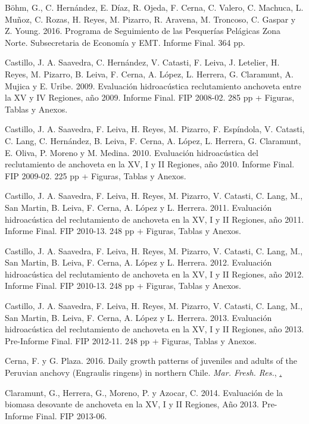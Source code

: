 \documentclass[letter,11pt]{article}
\begin{document}
B\"ohm, G., C. Hern\'andez, E. D\'iaz, R. Ojeda, F. Cerna, C. Valero, C.
Machuca, L. Mu\~{n}oz, C. Rozas, H. Reyes, M. Pizarro, R. Aravena, M.
Troncoso, C. Gaspar y Z. Young. 2016. Programa de Seguimiento de las
Pesquer\'ias Pel\'agicas Zona Norte. Subsecretaria de Econom\'ia y EMT.
Informe Final. 364 pp.


Castillo, J. A. Saavedra, C. Hern\'andez, V. Catasti, F. Leiva, J.
Letelier, H. Reyes, M. Pizarro, B. Leiva, F. Cerna, A. L\'opez, L.
Herrera, G. Claramunt, A. Mujica y E. Uribe. 2009. Evaluaci\'on
hidroac\'ustica reclutamiento anchoveta entre la XV y IV Regiones, a\~{n}o
2009. Informe Final. FIP 2008-02. 285 pp + Figuras, Tablas y Anexos.

Castillo, J. A. Saavedra, F. Leiva, H. Reyes, M. Pizarro, F. Esp\'indola,
V. Catasti, C. Lang, C. Hern\'andez, B. Leiva, F. Cerna, A. L\'opez, L.
Herrera, G. Claramunt, E. Oliva, P. Moreno y M. Medina. 2010. Evaluaci\'on
hidroac\'ustica del reclutamiento de anchoveta en la XV, I y II Regiones,
a\~{n}o 2010. Informe Final. FIP 2009-02. 225 pp + Figuras, Tablas y Anexos.

Castillo, J. A. Saavedra, F. Leiva, H. Reyes, M. Pizarro, V. Catasti, C.
Lang, M., San Martin, B. Leiva, F. Cerna, A. L\'opez y L. Herrera. 2011.
Evaluaci\'on hidroac\'ustica del reclutamiento de anchoveta en la XV, I y II
Regiones, a\~{n}o 2011. Informe Final. FIP 2010-13. 248 pp + Figuras, Tablas
y Anexos.

Castillo, J. A. Saavedra, F. Leiva, H. Reyes, M. Pizarro, V. Catasti, C.
Lang, M., San Martin, B. Leiva, F. Cerna, A. L\'opez y L. Herrera. 2012.
Evaluaci\'on hidroac\'ustica del reclutamiento de anchoveta en la XV, I y II
Regiones, a\~{n}o 2012. Informe Final. FIP 2010-13. 248 pp + Figuras, Tablas
y Anexos.

Castillo, J. A. Saavedra, F. Leiva, H. Reyes, M. Pizarro, V. Catasti, C.
Lang, M., San Martin, B. Leiva, F. Cerna, A. L\'opez y L. Herrera. 2013.
Evaluaci\'on hidroac\'ustica del reclutamiento de anchoveta en la XV, I y II
Regiones, a\~{n}o 2013. Pre-Informe Final. FIP 2012-11. 248 pp + Figuras,
Tablas y Anexos.

Cerna, F. y G. Plaza. 2016. Daily growth patterns of juveniles and
adults of the Peruvian anchovy (Engraulis ringens) in northern Chile.
\textit{Mar. Fresh. Res.}, \href{http://dx.doi.org/10.1071/MF15032}.


Claramunt, G., Herrera, G., Moreno, P. y Azocar, C. 2014. Evaluaci\'on de
la biomasa desovante de anchoveta en la XV, I y II Regiones, A\~{n}o 2013.
Pre-Informe Final. FIP 2013-06.
\end{document}
